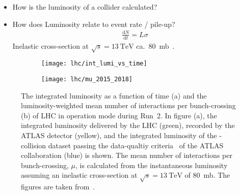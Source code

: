 \begin{itemize}
  \begin{itemize}
  \item Bunches \& Bunch spacing: 2556 (\SI{25}{\nano\second}) -- but 2808 RF
    buckets (not all filled)
  \item Protons per bunch: \num{1.1e11}
  \item Luminosity: \SI{2.1e34}{\per\centi\metre\squared\per\second} (design:
    \SI{1.0e34}{\per\centi\metre\squared\per\second})
  \item $\sqrt{s} = \SI{13}{\TeV}$
  \item Pile-up?
  \item Delivered integrated luminosity: about \SI{160}{\ifb}
    \end{itemize}

\item How is the luminosity of a collider calculated?

\item How does Luminosity relate to event rate / pile-up?
  \begin{align*}
    \frac{\mathrm{d}N}{\mathrm{d}t} = L \sigma
  \end{align*}
  Inelastic \pp cross-section at $\sqrt{s} = \SI{13}{\TeV}$ ca.\
  \SI{80}{\milli\barn}~\cite{STDM-2015-05}.

\end{itemize}


\begin{figure}[htbp]
  \centering

  \begin{subfigure}{0.47\textwidth}
    \texttt{[image: lhc/int\_lumi\_vs\_time]}
    \subcaption{}
  \end{subfigure}\hspace*{0.02\textwidth}%
  \begin{subfigure}{0.47\textwidth}
    \texttt{[image: lhc/mu\_2015\_2018]}
    \subcaption{}
  \end{subfigure}

  \caption{The integrated luminosity as a function of time (a) and the
    luminosity-weighted mean number of interactions per bunch-crossing (b) of
    LHC in \pp operation mode during Run~2. In figure (a), the integrated
    luminosity delivered by the LHC (green), recorded by the ATLAS detector
    (yellow), and the integrated luminosity of the \pp-collision dataset passing
    the data-qualtiy criteria~\cite{DAPR-2018-01} of the ATLAS collaboration
    (blue) is shown. The mean number of interactions per bunch-crossing, $\mu$,
    is calculated from the instantaneous luminosity assuming an inelastic \pp
    cross-section at $\sqrt{s} = \SI{13}{\TeV}$ of \SI{80}{\milli\barn}. The
    figures are taken from~\cite{atlas_luminosity_summary_plots}.}%
  \label{fig:lumi_and_pu}
\end{figure}

